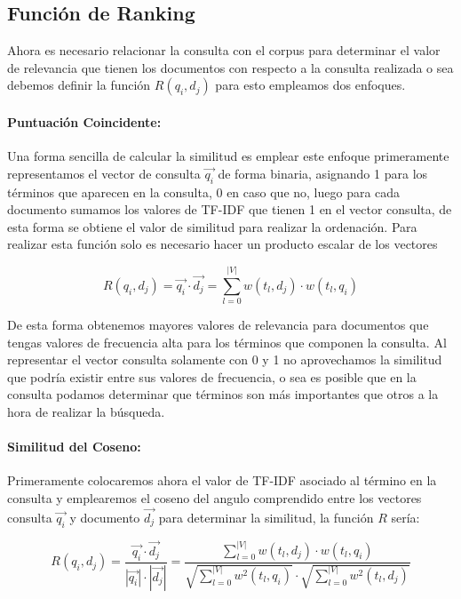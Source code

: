 \documentclass[runningheads,a4paper]{llncs}
\begin{document}
\subsection*{Función de Ranking} 

Ahora es necesario relacionar la consulta con el corpus para determinar el valor de relevancia que tienen los documentos con respecto a la consulta realizada o sea debemos definir la función $R(q_i, d_j)$ para esto empleamos dos enfoques.

\paragraph{Puntuación Coincidente:} Una forma sencilla de calcular la similitud es emplear este enfoque primeramente representamos el vector de consulta $\overrightarrow{q_i}$ de forma binaria, asignando 1 para los términos que aparecen en la consulta, 0 en caso que no, luego para cada documento sumamos los valores de TF-IDF que tienen 1 en el vector consulta, de esta forma se obtiene el valor de similitud para realizar la ordenación.
Para realizar esta función solo es necesario hacer un producto escalar de los vectores

\begin{equation}
	R(q_i, d_j) = \overrightarrow{q_i} \cdot \overrightarrow{d_j} = \sum_{l = 0}^{|V|} w(t_l, d_j) \cdot w(t_l, q_i)
\end{equation}

De esta forma obtenemos mayores valores de relevancia para documentos que tengas valores de frecuencia alta para los términos que componen la consulta. Al representar el vector consulta solamente con 0 y 1 no aprovechamos la similitud que podría existir entre sus valores de frecuencia, o sea es posible que en la consulta podamos determinar que términos son más importantes que otros a la hora de realizar la búsqueda. 

\paragraph{Similitud del Coseno:} Primeramente colocaremos ahora el valor de TF-IDF asociado al término en la consulta y emplearemos el coseno del angulo comprendido entre los vectores consulta $\overrightarrow{q_i}$ y documento $\overrightarrow{d_j}$ para determinar la similitud, la función $R$ sería:

\begin{equation}
	R(q_i, d_j) = \frac{\overrightarrow{q_i} \cdot \overrightarrow{d_j}}{|\overrightarrow{q_i}| \cdot |\overrightarrow{d_j}|} = \frac{\sum_{l = 0}^{|V|} w(t_l, d_j) \cdot w(t_l, q_i)}{\sqrt{\sum_{l = 0}^{|V|} w^2(t_l, q_i)} \cdot \sqrt{\sum_{l = 0}^{|V|} w^2(t_l, d_j)}}
\end{equation}
\end{document}
